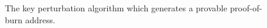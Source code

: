 \begin{figure}[t]
\begin{algorithm}[H]
    \caption{\label{alg.perturbation} The key perturbation algorithm which
             generates a provable proof-of-burn address.}
    \begin{algorithmic}[1]
            \State{}
        \EndFunction
            \EndIf
        \EndFunction
        \vskip8pt
    \end{algorithmic}
\end{algorithm}
\end{figure}
